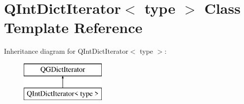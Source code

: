 \hypertarget{class_q_int_dict_iterator}{}\section{Q\+Int\+Dict\+Iterator$<$ type $>$ Class Template Reference}
\label{class_q_int_dict_iterator}
Inheritance diagram for Q\+Int\+Dict\+Iterator$<$ type $>$\+:\begin{figure}[H]
\begin{center}
\leavevmode
\includegraphics[height=2.000000cm]{class_q_int_dict_iterator}
\end{center}
\end{figure}
